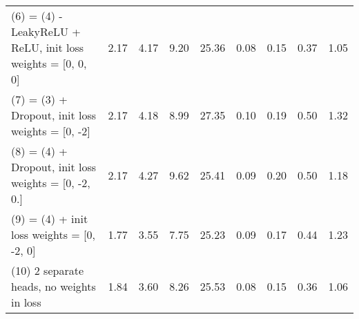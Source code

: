 \begin{table}[h!]
\begin{tabular}{lllllllll}
(6) = (4) - LeakyReLU + ReLU, init loss weights = [0, 0, 0] & {\cellcolor[HTML]{FDC171}} \color[HTML]{000000} 2.17 & {\cellcolor[HTML]{FFF1A8}} \color[HTML]{000000} 4.17 & {\cellcolor[HTML]{F1F9AC}} \color[HTML]{000000} 9.20 & {\cellcolor[HTML]{FEEC9F}} \color[HTML]{000000} 25.36 & {\cellcolor[HTML]{006837}} \color[HTML]{F1F1F1} 0.08 & {\cellcolor[HTML]{0E8245}} \color[HTML]{F1F1F1} 0.15 & {\cellcolor[HTML]{08773F}} \color[HTML]{F1F1F1} 0.37 & {\cellcolor[HTML]{006837}} \color[HTML]{F1F1F1} 1.05 \\
(7) = (3) + Dropout, init loss weights = [0, -2] & {\cellcolor[HTML]{FDC171}} \color[HTML]{000000} 2.17 & {\cellcolor[HTML]{FFF0A6}} \color[HTML]{000000} 4.18 & {\cellcolor[HTML]{DFF293}} \color[HTML]{000000} 8.99 & {\cellcolor[HTML]{F57245}} \color[HTML]{F1F1F1} 27.35 & {\cellcolor[HTML]{E6F59D}} \color[HTML]{000000} 0.10 & {\cellcolor[HTML]{E0F295}} \color[HTML]{000000} 0.19 & {\cellcolor[HTML]{FEE28F}} \color[HTML]{000000} 0.50 & {\cellcolor[HTML]{FFFEBE}} \color[HTML]{000000} 1.32 \\
(8) = (4) + Dropout, init loss weights = [0, -2, 0.] & {\cellcolor[HTML]{FDBF6F}} \color[HTML]{000000} 2.17 & {\cellcolor[HTML]{FEE28F}} \color[HTML]{000000} 4.27 & {\cellcolor[HTML]{FEEC9F}} \color[HTML]{000000} 9.62 & {\cellcolor[HTML]{FEEA9B}} \color[HTML]{000000} 25.41 & {\cellcolor[HTML]{C1E57B}} \color[HTML]{000000} 0.09 & {\cellcolor[HTML]{ECF7A6}} \color[HTML]{000000} 0.20 & {\cellcolor[HTML]{FEE491}} \color[HTML]{000000} 0.50 & {\cellcolor[HTML]{7FC866}} \color[HTML]{000000} 1.18 \\
(9) = (4) +  init loss weights = [0, -2, 0] & {\cellcolor[HTML]{78C565}} \color[HTML]{000000} 1.77 & {\cellcolor[HTML]{87CB67}} \color[HTML]{000000} 3.55 & {\cellcolor[HTML]{2DA155}} \color[HTML]{F1F1F1} 7.75 & {\cellcolor[HTML]{FFF0A6}} \color[HTML]{000000} 25.23 & {\cellcolor[HTML]{70C164}} \color[HTML]{000000} 0.09 & {\cellcolor[HTML]{6BBF64}} \color[HTML]{000000} 0.17 & {\cellcolor[HTML]{BBE278}} \color[HTML]{000000} 0.44 & {\cellcolor[HTML]{B9E176}} \color[HTML]{000000} 1.23 \\
(10) 2 separate heads, no weights in loss & {\cellcolor[HTML]{A5D86A}} \color[HTML]{000000} 1.84 & {\cellcolor[HTML]{96D268}} \color[HTML]{000000} 3.60 & {\cellcolor[HTML]{84CA66}} \color[HTML]{000000} 8.26 & {\cellcolor[HTML]{FEE695}} \color[HTML]{000000} 25.53 & {\cellcolor[HTML]{06733D}} \color[HTML]{F1F1F1} 0.08 & {\cellcolor[HTML]{006837}} \color[HTML]{F1F1F1} 0.15 & {\cellcolor[HTML]{006837}} \color[HTML]{F1F1F1} 0.36 & {\cellcolor[HTML]{026C39}} \color[HTML]{F1F1F1} 1.06 \\

\end{tabular}
\end{table}
